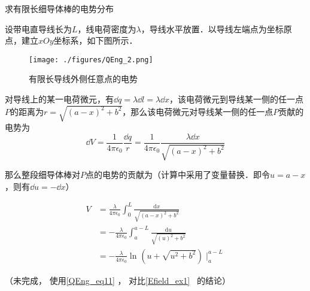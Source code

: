 \begin{example}{求有限长细导体棒的电势分布}

设带电直导线长为$L$，线电荷密度为$\lambda$，导线水平放置．以导线左端点为坐标原点，建立$xOy$坐标系，如下图所示．

\begin{figure}[ht]
\centering
\texttt{[image: ./figures/QEng\_2.png]}
\caption{有限长导线外侧任意点的电势} \label{QEng_fig2}
\end{figure}

对导线上的某一电荷微元，有$\dd q=\lambda \dd l=\lambda \dd x$，该电荷微元到导线某一侧的任一点$P$的距离为$r=\sqrt{(a-x)^2+b^2}$，那么该电荷微元对导线某一侧的任一点$P$贡献的电势为
\begin{equation}
\dd V=\frac{1}{4\pi \epsilon_0}\frac{\dd q}{r}=\frac{1}{4\pi \epsilon_0}\frac{\lambda \dd x}{\sqrt{(a-x)^2+b^2}}
\end{equation}

那么整段细导体棒对$P$点的电势的贡献为（计算中采用了变量替换．即令$u=a-x$，则有$\dd u=-\dd x$）

\begin{equation}
\begin{aligned}
V &=\frac{\lambda }{4 \pi \epsilon_{0}}\int_{0}^{L} \frac{\mathrm{d} x}{\sqrt{(a-x)^{2}+b^{2}}}\\
&=-\frac{\lambda }{4 \pi \epsilon_{0}}\int_{a}^{a-L} \frac{\mathrm{d} u}{\sqrt{(u)^{2}+b^{2}}}\\
&=-\frac{\lambda }{4 \pi \epsilon_{0}}\ln_{}{(u+\sqrt{u^2+b^2})}\mid_{a}^{a-L}
\end{aligned}
\end{equation}


（未完成， 使用\autoref{QEng_eq11} ， 对比\autoref{Efield_ex1}~ 的结论）

\end{example}

